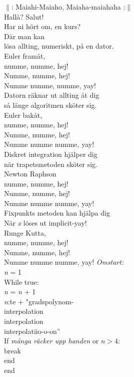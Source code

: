 \documentclass[a6paper,10pt]{article}
\begin{document}
\begin{center}
\end{center}
\begin{lyrics}
$\|$: Maiahi-Maiaho, Maiaha-maiahaha :$\|$
\vspace{5pt}\\
Hallå? Salut!\\
Har ni hört om, en kurs?\\
Där man kan\\
lösa allting, numeriskt, på en dator.
\vspace{5pt}\\
Euler framåt,\\
numme, numme, hej!\\
Numme, numme, hej!\\
Numme numme, numme, yay!\\
Datorn räknar ut allting åt dig\\
så länge algoritmen sköter sig.
\vspace{5pt}\\
Euler bakåt,\\
numme, numme, hej!\\
Numme, numme, hej!\\
Numme numme numme, yay!\\
Diskret integration hjälper dig\\
när trapetsmetoden sköter sig.
\vspace{5pt}\\
Newton Raphson\\
numme, numme, hej!\\
Numme, numme, hej!\\
Numme numme numme, yay!\\
Fixpunkts metoden kan hjälpa dig\\
När \textit{x} löses ut implicit-yay!
\vspace{5pt}\\
Runge Kutta,\\
numme, numme, hej!\\
Numme, numme, hej!\\
Numme numme numme, yay!
\setlength{\oddsidemargin}{-0.47in}
\noindent
\textit{Omstart:}
\vspace{3pt}\\
\textit{n} = 1\\
While true:\\
\indent
    \textit{n} = \textit{n} + 1\\
    \indent \textit{n}:te + "gradspolynom-\\
    \indent interpolation\\
    \indent interpolation\\
    \indent interpolatiio-o-on”\\
    \indent If \textit{många räcker upp handen} or $n>4$:\\
    \indent \indent break\\
    \indent end\\
end
\end{lyrics}
\end{document}
